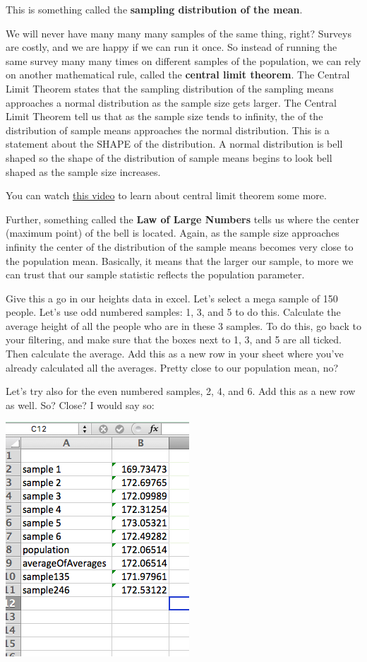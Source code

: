 \documentclass[]{book}
\theoremstyle{definition}
\theoremstyle{definition}
\theoremstyle{definition}
\theoremstyle{remark}
\begin{document}
This is something called the \textbf{sampling distribution of the mean}.

We will never have many many many samples of the same thing, right?
Surveys are costly, and we are happy if we can run it once. So instead
of running the same survey many many times on different samples of the
population, we can rely on another mathematical rule, called the
\textbf{central limit theorem}. The Central Limit Theorem states that
the sampling distribution of the sampling means approaches a normal
distribution as the sample size gets larger. The Central Limit Theorem
tell us that as the sample size tends to infinity, the of the
distribution of sample means approaches the normal distribution. This is
a statement about the SHAPE of the distribution. A normal distribution
is bell shaped so the shape of the distribution of sample means begins
to look bell shaped as the sample size increases.

You can watch \href{https://www.youtube.com/watch?v=JNm3M9cqWyc}{this
video} to learn about central limit theorem some more.

Further, something called the \textbf{Law of Large Numbers} tells us
where the center (maximum point) of the bell is located. Again, as the
sample size approaches infinity the center of the distribution of the
sample means becomes very close to the population mean. Basically, it
means that the larger our sample, to more we can trust that our sample
statistic reflects the population parameter.

Give this a go in our heights data in excel. Let's select a mega sample
of 150 people. Let's use odd numbered samples: 1, 3, and 5 to do this.
Calculate the average height of all the people who are in these 3
samples. To do this, go back to your filtering, and make sure that the
boxes next to 1, 3, and 5 are all ticked. Then calculate the average.
Add this as a new row in your sheet where you've already calculated all
the averages. Pretty close to our population mean, no?

Let's try also for the even numbered samples, 2, 4, and 6. Add this as a
new row as well. So? Close? I would say so:

\includegraphics{imgs/larger_samples.png}
\end{document}

